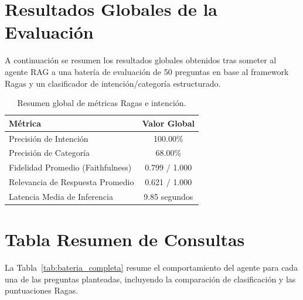 \documentclass[12pt,a4paper,oneside]{report}
\begin{document}


\section{Resultados Globales de la Evaluación}
A continuación se resumen los resultados globales obtenidos tras someter al agente RAG 
a una batería de evaluación de 50 preguntas en base al framework Ragas 
y un clasificador de intención/categoría estructurado.

\begin{table}[h!]
\centering
\begin{tabular}{lc}
\toprule
\textbf{Métrica} & \textbf{Valor Global} \\ \midrule
Precisión de Intención & 100.00\% \\
Precisión de Categoría & 68.00\% \\
Fidelidad Promedio (Faithfulness) & 0.799 / 1.000 \\
Relevancia de Respuesta Promedio & 0.621 / 1.000 \\
Latencia Media de Inferencia & 9.85 segundos \\ \bottomrule
\end{tabular}
\caption{Resumen global de métricas Ragas e intención.}
\label{tab:resumen_global_rag}
\end{table}

\newpage
\section{Tabla Resumen de Consultas}
La Tabla~\ref{tab:bateria_completa} resume el comportamiento del agente para cada una de 
las preguntas planteadas, incluyendo la comparación de clasificación y las puntuaciones Ragas.
\end{document}
